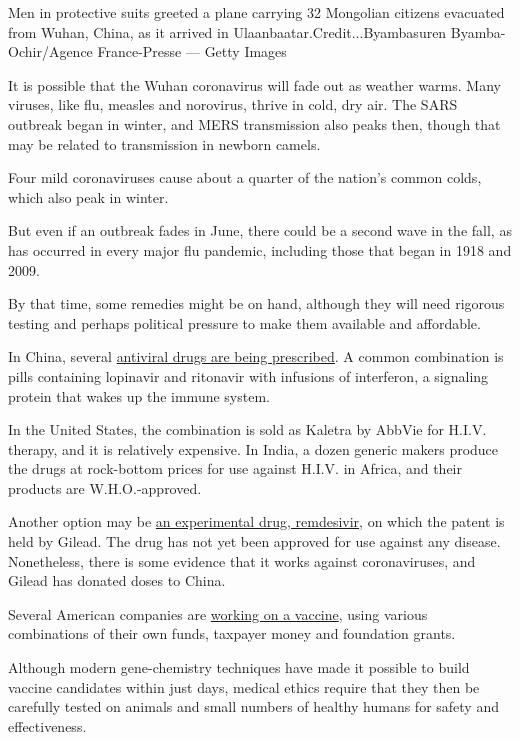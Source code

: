 Men in protective suits greeted a plane carrying 32 Mongolian citizens
evacuated from Wuhan, China, as it arrived in
Ulaanbaatar.Credit...Byambasuren Byamba-Ochir/Agence France-Presse ---
Getty Images

It is possible that the Wuhan coronavirus will fade out as weather
warms. Many viruses, like flu, measles and norovirus, thrive in cold,
dry air. The SARS outbreak began in winter, and MERS transmission also
peaks then, though that may be related to transmission in newborn
camels.

Four mild coronaviruses cause about a quarter of the nation's common
colds, which also peak in winter.

But even if an outbreak fades in June, there could be a second wave in
the fall, as has occurred in every major flu pandemic, including those
that began in 1918 and 2009.

By that time, some remedies might be on hand, although they will need
rigorous testing and perhaps political pressure to make them available
and affordable.

In China, several
\href{https://www.sciencemag.org/news/2020/01/can-anti-hiv-combination-or-other-existing-drugs-outwit-new-coronavirus}{antiviral
drugs are being prescribed}. A common combination is pills containing
lopinavir and ritonavir with infusions of interferon, a signaling
protein that wakes up the immune system.

In the United States, the combination is sold as Kaletra by AbbVie for
H.I.V. therapy, and it is relatively expensive. In India, a dozen
generic makers produce the drugs at rock-bottom prices for use against
H.I.V. in Africa, and their products are W.H.O.-approved.

Another option may be
\href{https://www.gilead.com/news-and-press/company-statements/gilead-sciences-statement-on-the-company-ongoing-response-to-the-2019-new-coronavirus}{an
experimental drug, remdesivir}, on which the patent is held by Gilead.
The drug has not yet been approved for use against any disease.
Nonetheless, there is some evidence that it works against coronaviruses,
and Gilead has donated doses to China.

Several American companies are
\href{https://www.nytimes3xbfgragh.onion/2020/01/28/health/coronavirus-vaccine.html}{working
on a vaccine}, using various combinations of their own funds, taxpayer
money and foundation grants.

Although modern gene-chemistry techniques have made it possible to build
vaccine candidates within just days, medical ethics require that they
then be carefully tested on animals and small numbers of healthy humans
for safety and effectiveness.

